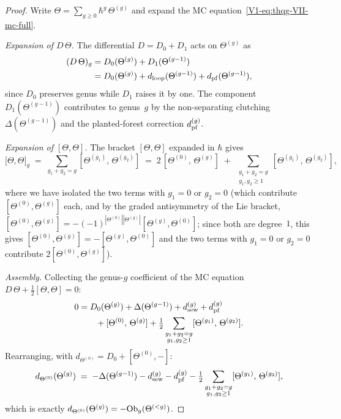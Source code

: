 \begin{proof}
Write $\Theta = \sum_{g \geq 0} \hbar^g\,\Theta^{(g)}$ and
expand the MC equation~\eqref{V1-eq:thqg-VII-mc-full}.

\medskip\noindent\emph{Expansion of $D\,\Theta$.}
The differential $D = D_0 + D_1$ acts on $\Theta^{(g)}$ as
\begin{align}
(D\,\Theta)_g
&= D_0(\Theta^{(g)}) + D_1(\Theta^{(g-1)})\notag\\
&= D_0(\Theta^{(g)})
 + d_{\mathrm{loop}}(\Theta^{(g-1)})
 + d_{\mathrm{pf}}(\Theta^{(g-1)}),
\end{align}
since $D_0$ preserves genus while $D_1$ raises it by one.
The component $D_1(\Theta^{(g-1)})$ contributes to genus~$g$
by the non-separating clutching $\Delta(\Theta^{(g-1)})$ and
the planted-forest correction $d_{\mathrm{pf}}^{(g)}$.

\medskip\noindent\emph{Expansion of $[\Theta,\Theta]$.}
The bracket $[\Theta,\Theta]$ expanded in $\hbar$ gives
\begin{equation}%
\bigl[\Theta,\Theta\bigr]_g
\;=\;
\sum_{g_1 + g_2 = g}
[\Theta^{(g_1)},\, \Theta^{(g_2)}]
\;=\;
2\,[\Theta^{(0)},\, \Theta^{(g)}]
\;+\;
\sum_{\substack{g_1 + g_2 = g \\ g_1, g_2 \geq 1}}
[\Theta^{(g_1)},\, \Theta^{(g_2)}],
\end{equation}
where we have isolated the two terms with $g_1 = 0$ or
$g_2 = 0$ (which contribute $[\Theta^{(0)}, \Theta^{(g)}]$
each, and by the graded antisymmetry of the Lie bracket,
$[\Theta^{(0)}, \Theta^{(g)}] = -(-1)^{|\Theta^{(0)}|
|\Theta^{(g)}|}[\Theta^{(g)}, \Theta^{(0)}]$; since both
are degree~$1$, this gives $[\Theta^{(0)}, \Theta^{(g)}]
= -[\Theta^{(g)}, \Theta^{(0)}]$ and the two terms with
$g_1 = 0$ or $g_2 = 0$ contribute
$2[\Theta^{(0)}, \Theta^{(g)}]$).

\medskip\noindent\emph{Assembly.}
Collecting the genus-$g$ coefficient of the MC equation
$D\,\Theta + \tfrac{1}{2}[\Theta,\Theta] = 0$:
\begin{align}
0 &= D_0(\Theta^{(g)})
 + \Delta(\Theta^{(g-1)})
 + d_{\mathrm{sew}}^{(g)} + d_{\mathrm{pf}}^{(g)}
 \notag\\
 &\qquad
 + [\Theta^{(0)},\, \Theta^{(g)}]
 + \tfrac{1}{2}
 \sum_{\substack{g_1 + g_2 = g \\ g_1, g_2 \geq 1}}
 [\Theta^{(g_1)},\, \Theta^{(g_2)}].
\end{align}
Rearranging, with $d_{\Theta^{(0)}} = D_0 +
[\Theta^{(0)}, -]$:
\begin{equation}%
d_{\Theta^{(0)}}(\Theta^{(g)})
\;=\;
-\Delta(\Theta^{(g-1)})
- \dsew^{(g)} - \dpf^{(g)}
- \tfrac{1}{2}
 \sum_{\substack{g_1 + g_2 = g \\ g_1, g_2 \geq 1}}
 [\Theta^{(g_1)},\, \Theta^{(g_2)}],
\end{equation}
which is exactly $d_{\Theta^{(0)}}(\Theta^{(g)}) = -\mathrm{Ob}_g(\Theta^{(<g)})$.


\end{proof}
